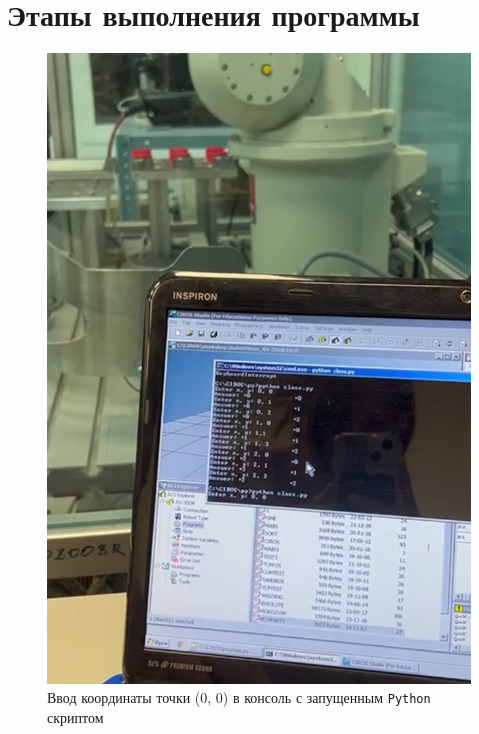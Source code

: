 \documentclass[a4paper, 12pt]{article}
\begin{document}
    \section{Этапы выполнения программы}
    \begin{figure}[H]
        \centering
        \includegraphics[scale=1]{input00.png}
        \captionsetup{skip=0pt}
        \caption{Ввод координаты точки (0, 0) в консоль с запущенным \texttt{Python} скриптом}
        \label{fig:input00}
    \end{figure}
\end{document}
